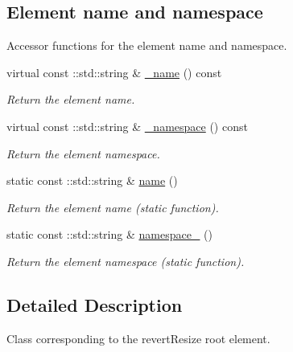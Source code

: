 \subsection*{Element name and namespace}
\label{_amgrpd4b5b61f6e07390f4af2465e04571f34}
Accessor functions for the element name and namespace. \begin{DoxyCompactItemize}
\item 
virtual const ::std::string \& \hyperlink{classopenstack_1_1xml_1_1RevertResize___a1370563d4de209d9fc8b84c0772eb198}{\_\-name} () const 
\begin{DoxyCompactList}\small\item\em Return the element name. \item\end{DoxyCompactList}\item 
virtual const ::std::string \& \hyperlink{classopenstack_1_1xml_1_1RevertResize___addeae27b6ceed124c3ddba8033c667aa}{\_\-namespace} () const 
\begin{DoxyCompactList}\small\item\em Return the element namespace. \item\end{DoxyCompactList}\item 
static const ::std::string \& \hyperlink{classopenstack_1_1xml_1_1RevertResize___a63226e6d4d45cbc461580bc6224ac1f7}{name} ()
\begin{DoxyCompactList}\small\item\em Return the element name (static function). \item\end{DoxyCompactList}\item 
static const ::std::string \& \hyperlink{classopenstack_1_1xml_1_1RevertResize___a72b8431ca0755f793946dcfa92f3dd5f}{namespace\_\-} ()
\begin{DoxyCompactList}\small\item\em Return the element namespace (static function). \item\end{DoxyCompactList}\end{DoxyCompactItemize}


\subsection{Detailed Description}
Class corresponding to the revertResize root element. 

